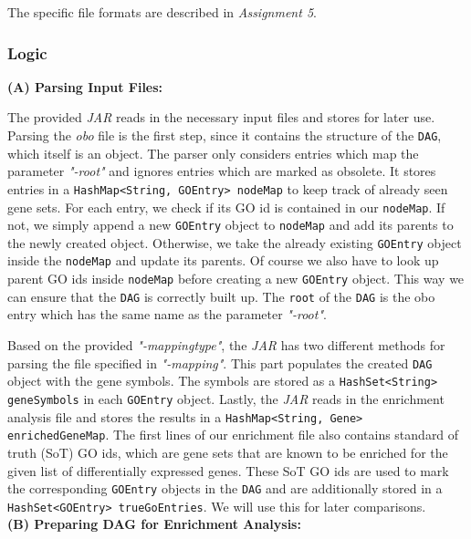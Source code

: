 \documentclass[12pt]{article}
\begin{document}
The specific file formats are described in \textit{Assignment 5}.
\newpage
\subsubsection{Logic}\label{sec:Logic}
\textbf{(A) Parsing Input Files:}

The provided \textit{JAR} reads in the necessary input files and stores for later use.
Parsing the \textit{obo} file is the first step, since it contains the structure
of the \texttt{DAG}, which itself is an object. The parser only considers entries which map
the parameter \textit{"-root"} and ignores entries which are marked as obsolete.
It stores entries in a \texttt{HashMap<String, GOEntry> nodeMap} to keep 
track of already seen gene sets. For each entry, we check if
its GO id is contained in our \texttt{nodeMap}. If not, we simply append
a new \texttt{GOEntry} object to \texttt{nodeMap} and add its parents 
to the newly created object. Otherwise, we take the already existing \texttt{GOEntry} 
object inside the \texttt{nodeMap} and update its parents. 
Of course we also have to look up parent GO ids inside \texttt{nodeMap}
before creating a new \texttt{GOEntry} object. This way we can ensure that 
the \texttt{DAG} is correctly built up. The \texttt{root} of the \texttt{DAG} is
the obo entry which has the same name as the parameter \textit{"-root"}.

Based on the provided \textit{"-mappingtype"}, the \textit{JAR} has two different 
methods for parsing the file specified in \textit{"-mapping"}. 
This part populates the created \texttt{DAG} object with the gene symbols.
The symbols are stored as a \texttt{HashSet<String> geneSymbols} in each \texttt{GOEntry} object.
Lastly, the \textit{JAR} reads in the enrichment analysis file and stores the results
in a \texttt{HashMap<String, Gene> enrichedGeneMap}. The first lines of our enrichment file
also contains standard of truth (SoT) GO ids, which are gene sets that are known to be
enriched for the given list of differentially expressed genes. These SoT GO ids are 
used to mark the corresponding \texttt{GOEntry} objects in the \texttt{DAG} and are
additionally stored in a \texttt{HashSet<GOEntry> trueGoEntries}. We will use this
for later comparisons.\\
\hspace{1mm}
\hspace{1mm}
\textbf{(B) Preparing DAG for Enrichment Analysis:}
\end{document}
